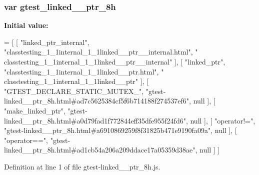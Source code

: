 \subsubsection[{\texorpdfstring{gtest\+\_\+linked\+\_\+\+\_\+ptr\+\_\+8h}{gtest_linked__ptr_8h}}]{\setlength{\rightskip}{0pt plus 5cm}var gtest\+\_\+linked\+\_\+\+\_\+ptr\+\_\+8h}\hypertarget{gtest-linked____ptr__8h_8js_a98c3a938dd19df8cea14e5280f4c08fd}{}\label{gtest-linked____ptr__8h_8js_a98c3a938dd19df8cea14e5280f4c08fd}
{\bfseries Initial value\+:}
\begin{DoxyCode}
=
[
    [ \textcolor{stringliteral}{"linked\_ptr\_internal"}, \textcolor{stringliteral}{"classtesting\_1\_1internal\_1\_1linked\_\_ptr\_\_internal.html"}, \textcolor{stringliteral}{"
      classtesting\_1\_1internal\_1\_1linked\_\_ptr\_\_internal"} ],
    [ \textcolor{stringliteral}{"linked\_ptr"}, \textcolor{stringliteral}{"classtesting\_1\_1internal\_1\_1linked\_\_ptr.html"}, \textcolor{stringliteral}{"
      classtesting\_1\_1internal\_1\_1linked\_\_ptr"} ],
    [ \textcolor{stringliteral}{"GTEST\_DECLARE\_STATIC\_MUTEX\_"}, \textcolor{stringliteral}{"gtest-linked\_\_ptr\_8h.html#ad7c5625384cf5f6b714188f274537ef6"}, null ],
    [ \textcolor{stringliteral}{"make\_linked\_ptr"}, \textcolor{stringliteral}{"gtest-linked\_\_ptr\_8h.html#a0d79fad1f772844eff35dfe955f24fd6"}, null ],
    [ \textcolor{stringliteral}{"operator!="}, \textcolor{stringliteral}{"gtest-linked\_\_ptr\_8h.html#a6910869259f8f31825b471e9190fa09a"}, null ],
    [ \textcolor{stringliteral}{"operator=="}, \textcolor{stringliteral}{"gtest-linked\_\_ptr\_8h.html#ad1cb54a206a209ddace17a05359d38ae"}, null ]
]
\end{DoxyCode}


Definition at line 1 of file gtest-\/linked\+\_\+\+\_\+ptr\+\_\+8h.\+js.

